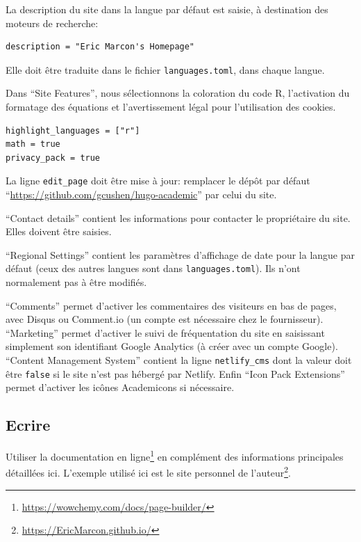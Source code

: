 \documentclass[
  12pt,
  french,
  a4paper,
  extrafontsizes,onecolumn,openright
  ]{memoir}
\begin{document}
La description du site dans la langue par défaut est saisie, à destination des moteurs de recherche:

\begin{verbatim}
description = "Eric Marcon's Homepage"
\end{verbatim}

Elle doit être traduite dans le fichier \texttt{languages.toml}, dans chaque langue.

Dans \enquote{Site Features}, nous sélectionnons la coloration du code R, l'activation du formatage des équations et l'avertissement légal pour l'utilisation des cookies.

\begin{verbatim}
highlight_languages = ["r"] 
math = true
privacy_pack = true
\end{verbatim}

La ligne \texttt{edit\_page} doit être mise à jour: remplacer le dépôt par défaut \enquote{\url{https://github.com/gcushen/hugo-academic}} par celui du site.

\enquote{Contact details} contient les informations pour contacter le propriétaire du site.
Elles doivent être saisies.

\enquote{Regional Settings} contient les paramètres d'affichage de date pour la langue par défaut (ceux des autres langues sont dans \texttt{languages.toml}).
Ils n'ont normalement pas à être modifiés.

\enquote{Comments} permet d'activer les commentaires des visiteurs en bas de pages, avec Disqus ou Comment.io (un compte est nécessaire chez le fournisseur).
\enquote{Marketing} permet d'activer le suivi de fréquentation du site en saisissant simplement son identifiant Google Analytics (à créer avec un compte Google).
\enquote{Content Management System} contient la ligne \texttt{netlify\_cms} dont la valeur doit être \texttt{false} si le site n'est pas hébergé par Netlify.
Enfin \enquote{Icon Pack Extensions} permet d'activer les icônes Academicons si nécessaire.

\hypertarget{ecrire-3}{%
\subsection{Ecrire}\label{ecrire-3}}

Utiliser la documentation en ligne\footnote{\url{https://wowchemy.com/docs/page-builder/}} en complément des informations principales détaillées ici.
L'exemple utilisé ici est le site personnel de l'auteur\footnote{\url{https://EricMarcon.github.io/}}.
\end{document}
